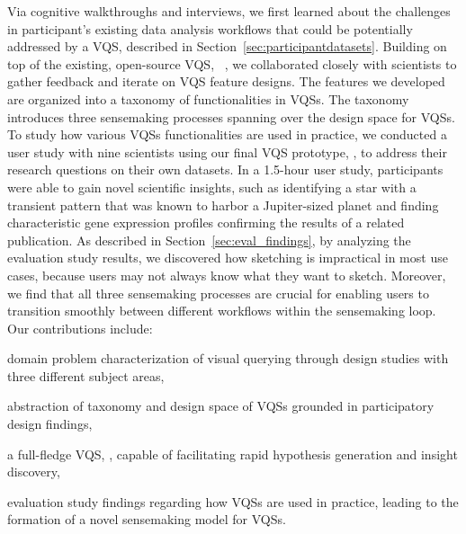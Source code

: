 \par Via cognitive walkthroughs and interviews, we first learned about the challenges in participant's existing data analysis workflows that could be potentially addressed by a VQS, described in Section~\ref{sec:participantdatasets}. %
Building on top of the existing, open-source VQS, \zv~\cite{Siddiqui2017,Siddiqui2017VLDB}, we collaborated closely with scientists to gather feedback and iterate on VQS feature designs. The features we developed are organized into a taxonomy of functionalities in VQSs. The taxonomy introduces three sensemaking processes spanning over the design space for VQSs. To study how various VQSs functionalities are used in practice, we conducted a user study with nine scientists using our final VQS prototype, \zvpp, to address their research questions on their own datasets. In a 1.5-hour user study, participants were able to gain novel scientific insights, such as identifying a star with a transient pattern that was known to harbor a Jupiter-sized planet and finding characteristic gene expression profiles confirming the results of a related publication.  As described in Section~\ref{sec:eval_findings}, by analyzing the evaluation study results, we discovered how sketching is impractical in most use cases, because users may not always know what they want to sketch. Moreover, we find that all three sensemaking processes are crucial for enabling users to transition smoothly between different workflows within the sensemaking loop. Our contributions include: 
\begin{denselist}
\item domain problem characterization of visual querying through design studies with three different subject areas,
\item abstraction of taxonomy and design space of VQSs grounded in participatory design findings,
\item a full-fledge VQS, \zvpp, capable of facilitating rapid hypothesis generation and insight discovery,
\item evaluation study findings regarding how VQSs are used in practice, leading to the formation of a novel sensemaking model for VQSs. %
\end{denselist}
